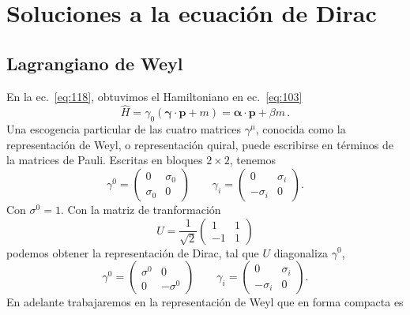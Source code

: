 \section{Soluciones a la ecuaci\'on de Dirac}
\label{sec:soluc-la-ecuac}

\subsection{Lagrangiano de Weyl}
\label{sec:lagrangiano-de-weyl}


En la ec.~\eqref{eq:118}, obtuvimos el Hamiltoniano en ec.~\eqref{eq:103}
\begin{equation}
  \hat{H}= \gamma_0(\boldsymbol{\gamma}\cdot\mathbf{p}+m)=\boldsymbol{\alpha}\cdot\mathbf{p}+\beta m\,.
\end{equation}
Una escogencia particular de las cuatro matrices $\gamma^\mu$, conocida como la representaci\'on de Weyl, o representaci\'on quiral, puede escribirse en t\'erminos de la matrices de Pauli. Escritas en bloques $2\times2$, tenemos
\begin{equation}
  \gamma^0=
  \begin{pmatrix}
    0&\sigma_0\\
    \sigma_0&0
  \end{pmatrix}\qquad
  \gamma_i=\begin{pmatrix}
    0&\sigma_i\\
    -\sigma_i&0
  \end{pmatrix}.
\end{equation}
Con $\sigma^0=1$. Con la matriz de tranformaci\'on
\begin{equation}
  U=\frac{1}{\sqrt{2}}
  \begin{pmatrix}
    1&1\\
    -1&1    
  \end{pmatrix}
\end{equation}
podemos obtener la representaci\'on de Dirac, tal que $U$ diagonaliza $\gamma^0$,
\begin{equation}
  \gamma^0=
  \begin{pmatrix}
    \sigma^0&0\\
    0&-\sigma^0
  \end{pmatrix}\qquad
  \gamma_i=\begin{pmatrix}
    0&\sigma_i\\
    -\sigma_i&0
  \end{pmatrix}.
\end{equation}
En adelante trabajaremos en la representaci\'on de Weyl que en forma compacta es
